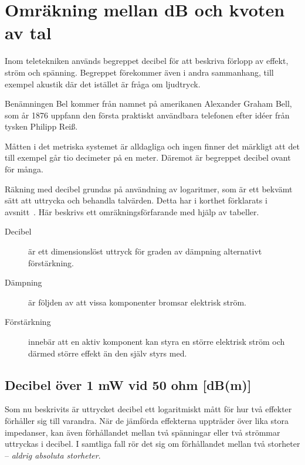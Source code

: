 \chapter{Omräkning mellan dB och kvoten av tal}
\label{ch:decibel2}

\noindent
Inom teletekniken används begreppet decibel för att beskriva förlopp
av effekt, ström och spänning. Begreppet förekommer även i andra
sammanhang, till exempel akustik där det istället är fråga om ljudtryck.

\begin{tcolorbox}[title=Historia]
Benämningen Bel kommer från namnet på amerikanen Alexander Graham
Bell, som år 1876 uppfann den första praktiskt användbara telefonen
efter idéer från tysken Philipp Reiß.
\end{tcolorbox}

Måtten i det metriska systemet är alldagliga och ingen finner det märkligt att
det till exempel går tio decimeter på en meter.
Däremot är begreppet decibel ovant för många.

Räkning med decibel grundas på användning av logaritmer, som är ett
bekvämt sätt att uttrycka och behandla talvärden.
Detta har i korthet förklarats i avsnitt~.
Här beskrivs ett omräkningsförfarande med hjälp av tabeller.

\begin{description}
\item[Decibel] är ett dimensionslöst uttryck för graden av dämpning
  alternativt förstärkning.

\item[Dämpning] är följden av att vissa komponenter bromsar elektrisk
  ström.

\item[Förstärkning] innebär att en aktiv komponent kan styra en större
  elektrisk ström och därmed större effekt än den själv styrs med.
\end{description}

\section{Decibel över 1 mW vid 50 ohm [dB(m)]}

Som nu beskrivits är uttrycket decibel ett logaritmiskt mått för hur två
effekter förhåller sig till varandra.
När de jämförda effekterna uppträder över lika stora impedanser, kan även
förhållandet mellan två spänningar eller två strömmar uttryckas i decibel.
I samtliga fall rör det sig om förhållandet mellan två storheter --
\emph{aldrig absoluta storheter}.

